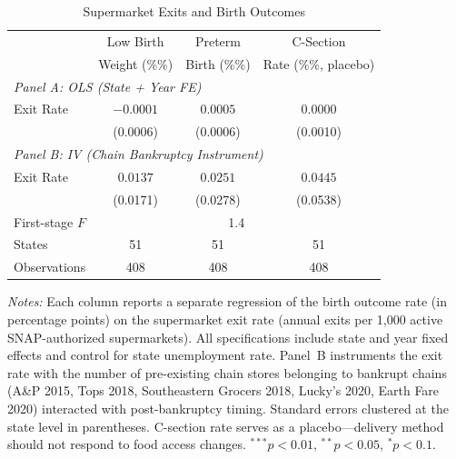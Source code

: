 \begin{table}[htbp]
\centering
\begin{threeparttable}
\caption{Supermarket Exits and Birth Outcomes}
\label{tab:main}
\begin{tabular}{lccc}
\hline\hline
 & Low Birth & Preterm & C-Section \\
 & Weight (\%\%) & Birth (\%\%) & Rate (\%\%, placebo) \\
\hline
\multicolumn{4}{l}{\textit{Panel A: OLS (State + Year FE)}} \\[3pt]
Exit Rate & $-0.0001$ & $0.0005$ & $0.0000$ \\
 & (0.0006) & (0.0006) & (0.0010) \\[6pt]
\multicolumn{4}{l}{\textit{Panel B: IV (Chain Bankruptcy Instrument)}} \\[3pt]
Exit Rate & $0.0137$ & $0.0251$ & $0.0445$ \\
 & (0.0171) & (0.0278) & (0.0538) \\[3pt]
First-stage $F$ & \multicolumn{3}{c}{1.4} \\
\hline
States & 51 & 51 & 51 \\
Observations & 408 & 408 & 408 \\
\hline\hline
\end{tabular}
\begin{tablenotes}[flushleft]
\footnotesize
\item \textit{Notes:} Each column reports a separate regression of the birth outcome rate
(in percentage points) on the supermarket exit rate (annual exits per 1,000 active
SNAP-authorized supermarkets). All specifications include state and year fixed effects
and control for state unemployment rate.
Panel~B instruments the exit rate with the number of pre-existing chain stores belonging
to bankrupt chains (A\&P 2015, Tops 2018, Southeastern Grocers 2018, Lucky's 2020,
Earth Fare 2020) interacted with post-bankruptcy timing.
Standard errors clustered at the state level in parentheses.
C-section rate serves as a placebo---delivery method should not respond to
food access changes.
$^{***}p<0.01$, $^{**}p<0.05$, $^{*}p<0.1$.
\end{tablenotes}
\end{threeparttable}
\end{table}
